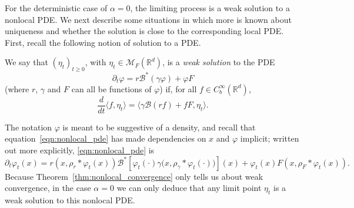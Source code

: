 \documentclass[EJP]{ejpecp} %
\newcommand{\IR}{\mathbb R}
\newcommand{\DG}{\mathcal{B}}  %
\newcommand{\kernel}{\rho}  %
\newcommand{\smooth}[1]{\kernel_{#1} \! * \!}  %
\newcommand{\measures}{\mathcal{M}_F(\IR^d)} %
\begin{document}
For the deterministic case of $\alpha=0$,
the limiting process is a weak solution to a nonlocal PDE.
We next describe some situations in which more is known
about uniqueness and whether the solution is close to the corresponding local PDE.
First, recall the following notion of solution to a PDE.
\begin{definition}
    \label{defn:weak_solutions}
    We say that $(\eta_t)_{t \ge 0}$, with $\eta_t \in \measures$,
    is a \emph{weak solution} to the PDE
    \begin{equation} \label{eqn:nonlocal_pde}
        \partial_t \varphi = r \DG^*(\gamma \varphi) + \varphi F
    \end{equation}
	(where $r$, $\gamma$ and $F$ can all be functions of $\varphi$)
    if, for all $f \in C_b^\infty(\IR^d)$,
    \[
        \frac{d}{dt} \langle f, \eta_t \rangle
        =
        \langle
	    \gamma \DG(rf) + f F,
            \eta_t
        \rangle .
    \]
\end{definition}
The notation $\varphi$ is meant to be suggestive of a density,
and recall that equation~\eqref{eqn:nonlocal_pde} has made dependencies on $x$ and $\varphi$ implicit;
written out more explicitly, \eqref{eqn:nonlocal_pde} is
\[
    \partial_t \varphi_t(x)
    =
    r\left(x, \smooth{r} \varphi_t(x) \right)
    \DG^* \left[
        \varphi_t(\cdot)
        \gamma\big( x, \smooth{\gamma} \varphi_t(\cdot) \big)
    \right](x)
    +
    \varphi_t(x)
    F\left(x, \smooth{F} \varphi_t(x) \right)
    .
\]
Because Theorem~\ref{thm:nonlocal_convergence} only tells us about 
weak convergence, in the case $\alpha=0$ we can only deduce that 
any limit point $\eta_t$ is a weak solution to this nonlocal PDE.
\end{document}
